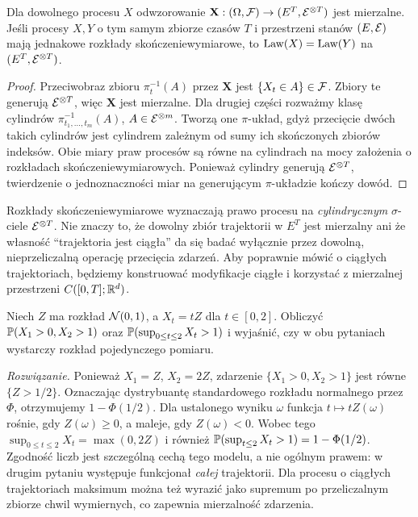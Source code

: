 \begin{stwierdzenie}
Dla dowolnego procesu $X$ odwzorowanie
$\mathbf X:(\Omega,\mathcal{F})\to(E^T,\mathcal{E}^{\otimes T})$ jest
mierzalne. Jeśli procesy $X,Y$ o tym samym zbiorze czasów $T$
i przestrzeni stanów $(E,\mathcal{E})$ mają jednakowe rozkłady
skończeniewymiarowe, to $\operatorname{Law}(X)=\operatorname{Law}(Y)$ na
$(E^T,\mathcal{E}^{\otimes T})$.
\end{stwierdzenie}
\begin{proof}
Przeciwobraz zbioru $\pi_t^{-1}(A)$ przez $\mathbf X$ jest
$\{X_t\in A\}\in\mathcal{F}$. Zbiory te generują $\mathcal{E}^{\otimes T}$,
więc $\mathbf X$ jest mierzalne. Dla drugiej części rozważmy
klasę cylindrów $\pi_{t_1,\ldots,t_m}^{-1}(A)$,
$A\in\mathcal{E}^{\otimes m}$. Tworzą one $\pi$-układ, gdyż przecięcie
dwóch takich cylindrów jest cylindrem zależnym od sumy ich
skończonych zbiorów indeksów. Obie miary praw procesów
są równe na cylindrach na mocy założenia o rozkładach
skończeniewymiarowych. Ponieważ cylindry generują
$\mathcal{E}^{\otimes T}$, twierdzenie o jednoznaczności miar
na generującym $\pi$-układzie kończy dowód.
\end{proof}

\begin{uwaga}
Rozkłady skończeniewymiarowe wyznaczają prawo procesu na
\emph{cylindrycznym} $\sigma$-ciele $\mathcal{E}^{\otimes T}$.
Nie znaczy to, że dowolny zbiór trajektorii w $E^T$ jest mierzalny
ani że własność ``trajektoria jest ciągła'' da się badać
wyłącznie przez dowolną, nieprzeliczalną operację przecięcia
zdarzeń. Aby poprawnie mówić o ciągłych trajektoriach, będziemy
konstruować modyfikacje ciągłe i korzystać z mierzalnej przestrzeni
$C([0,T];\mathbb{R}^d)$.
\end{uwaga}


\begin{zadanie}
Niech $Z$ ma rozkład $\mathcal{N}(0,1)$, a $X_t=tZ$ dla
$t\in[0,2]$. Obliczyć $\mathbb{P}(X_1>0,X_2>1)$ oraz
$\mathbb{P}(\sup_{0\le t\le2}X_t>1)$ i wyjaśnić, czy w obu pytaniach
wystarczy rozkład pojedynczego pomiaru.

\emph{Rozwiązanie.} Ponieważ $X_1=Z$, $X_2=2Z$,
zdarzenie $\{X_1>0,X_2>1\}$ jest równe $\{Z>1/2\}$.
Oznaczając dystrybuantę standardowego rozkładu normalnego przez
$\Phi$, otrzymujemy $1-\Phi(1/2)$.
Dla ustalonego wyniku $\omega$ funkcja $t\mapsto tZ(\omega)$
rośnie, gdy $Z(\omega)\ge0$, a maleje, gdy $Z(\omega)<0$.
Wobec tego $\sup_{0\le t\le2}X_t=\max(0,2Z)$ i również
$\mathbb{P}(\sup_{t\le2}X_t>1)=1-\Phi(1/2)$.
Zgodność liczb jest szczególną cechą tego modelu, a nie ogólnym
prawem: w drugim pytaniu występuje funkcjonał \emph{całej}
trajektorii. Dla procesu o ciągłych trajektoriach maksimum można
też wyrazić jako supremum po przeliczalnym zbiorze chwil
wymiernych, co zapewnia mierzalność zdarzenia.
\end{zadanie}

